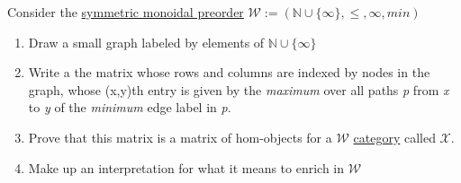 Consider the \hyperref[D2.2]{symmetric monoidal preorder} $\mathcal{W}:=(\mathbb{N}\cup\{\infty\},\leq,\infty,min)$
    \begin{enumerate}
      \item Draw a small graph labeled by elements of $\mathbb{N}\cup\{\infty\}$
      \item Write a the matrix whose rows and columns are indexed by nodes in the graph, whose (x,y)th entry is given by the \emph{maximum} over all paths \emph{p} from \emph{x} to \emph{y} of the \emph{minimum} edge label in \emph{p}.
      \item Prove that this matrix is a matrix of hom-objects for a $\mathcal{W}$ \hyperref[D2.46]{category} called $\mathcal{X}$.
      \item Make up an interpretation for what it means to enrich in $\mathcal{W}$
    \end{enumerate}